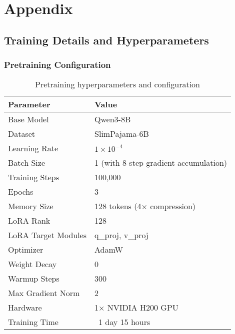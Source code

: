 \appendix
\chapter{Appendix}


\section{Training Details and Hyperparameters}
\label{app:training_details}

\subsection{Pretraining Configuration}

\begin{table}[h]
    \centering
    \small
    \begin{tabular}{ll}
        \toprule
        \textbf{Parameter} & \textbf{Value} \\
        \midrule
        Base Model & Qwen3-8B \\
        Dataset & SlimPajama-6B \\
        Learning Rate & $1 \times 10^{-4}$ \\
        Batch Size & 1 (with 8-step gradient accumulation) \\
        Training Steps & 100,000 \\
        Epochs & 3 \\
        Memory Size & 128 tokens (4× compression) \\
        LoRA Rank & 128 \\
        LoRA Target Modules & q\_proj, v\_proj \\
        Optimizer & AdamW \\
        Weight Decay & 0 \\
        Warmup Steps & 300 \\
        Max Gradient Norm & 2 \\
        Hardware & 1× NVIDIA H200 GPU \\
        Training Time & ~1 day 15 hours \\
        \bottomrule
    \end{tabular}
    \caption{Pretraining hyperparameters and configuration}
    \label{tab:pretrain_config}
\end{table}

